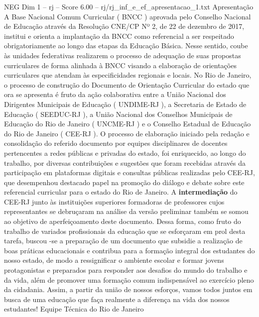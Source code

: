 \begin{textsample}{NEG Dim 1 – rj – Score 6.00 – rj/rj\_inf\_e\_ef\_apresentacao\_1.txt}  \label{ex:f1_neg_015}
Apresentação A Base Nacional Comum Curricular ( BNCC ) aprovada pelo Conselho Nacional de Educação através da Resolução CNE/CP Nº 2, de 22 de dezembro de 2017, institui e orienta a implantação da BNCC como referencial a ser respeitado obrigatoriamente ao longo das etapas da Educação Básica.
Nesse sentido, coube às unidades federativas realizarem o processo de adequação de suas propostas curriculares de forma alinhada à BNCC visando a elaboração de orientações curriculares que atendam às especificidades regionais e locais.
No Rio de Janeiro, o processo de construção do Documento de Orientação Curricular do estado que ora se apresenta é fruto da ação colaborativa entre a União Nacional dos Dirigentes Municipais de Educação ( UNDIME-RJ ), a Secretaria de Estado de Educação ( SEEDUC-RJ ), a União Nacional dos Conselhos Municipais de Educação do Rio de Janeiro ( UNCME-RJ ) e o Conselho Estadual de Educação do Rio de Janeiro ( CEE-RJ ).
O processo de elaboração iniciado pela redação e consolidação do referido documento por equipes disciplinares de docentes pertencentes a redes públicas e privadas do estado, foi enriquecido, ao longo do trabalho, por diversas contribuições e sugestões que foram recebidas através da participação em plataformas digitais e consultas públicas realizadas pelo CEE-RJ, que desempenhou destacado papel na promoção do diálogo e debate sobre este referencial curricular para o estado do Rio de Janeiro.
A \textbf{intermediação} do CEE-RJ junto às instituições superiores formadoras de professores cujos representantes se debruçaram na análise da versão preliminar também se somou ao objetivo de aperfeiçoamento deste documento.
Dessa forma, como fruto do trabalho de variados profissionais da educação que se esforçaram em prol desta tarefa, buscou -se a preparação de um documento que subsidie a realização de boas práticas educacionais e contribua para a formação integral dos estudantes do nosso estado, de modo a ressignificar o ambiente escolar e formar jovens protagonistas e preparados para responder aos desafios do mundo do trabalho e da vida, além de promover uma formação comum indispensável ao exercício pleno da cidadania.
Assim, a partir da união de nossos esforços, vamos todos juntos em busca de uma educação que faça realmente a diferença na vida dos nossos estudantes!
Equipe Técnica do Rio de Janeiro

\end{textsample}
